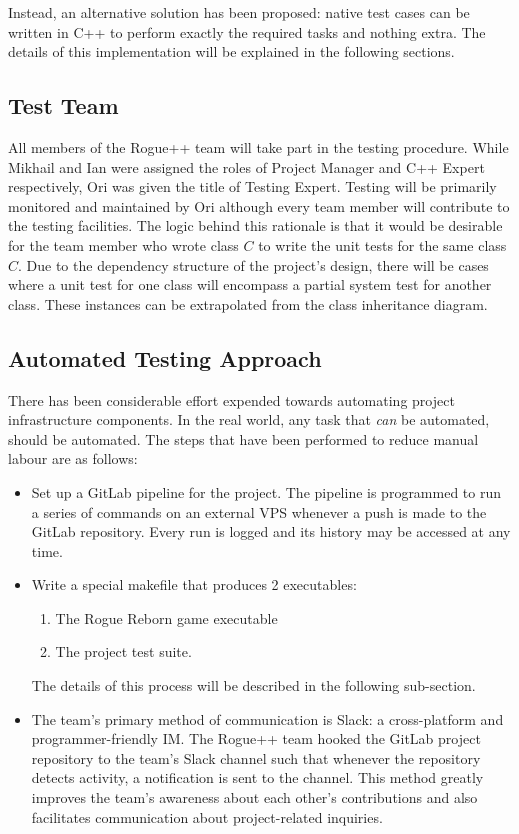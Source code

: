 \documentclass[12pt, titlepage]{article}
\begin{document}
	Instead, an alternative solution has been proposed: native test cases can be written in C++ to perform exactly the required tasks and nothing extra.  The details of this implementation will be explained in the following sections.

	\subsection{Test Team}

	All members of the Rogue++ team will take part in the testing procedure.  While Mikhail and Ian were assigned the roles of Project Manager and C++ Expert respectively, Ori was given the title of Testing Expert. Testing will be primarily monitored and maintained by Ori although every team member will contribute to the testing facilities.  The logic behind this rationale is that it would be desirable for the team member who wrote class $C$ to write the unit tests for the same class $C$.  Due to the dependency structure of the project's design, there will be cases where a unit test for one class will encompass a partial system test for another class.  These instances can be extrapolated from the class inheritance diagram.

	\subsection{Automated Testing Approach}

	There has been considerable effort expended towards automating project infrastructure components.  In the real world, any task that \textit{can} be automated, should be automated.  The steps that have been performed to reduce manual labour are as follows:

	\begin{itemize}
		\item Set up a GitLab pipeline for the project.  The pipeline is programmed to run a series of commands on an external VPS whenever a push is made to the GitLab repository.  Every run is logged and its history may be accessed at any time.
		\item Write a special makefile that produces 2 executables:
		\begin{enumerate}
			\item The Rogue Reborn game executable
			\item The project test suite.
		\end{enumerate}
		The details of this process will be described in the following sub-section.
		\item The team's primary method of communication is Slack: a cross-platform and programmer-friendly IM.  The Rogue++ team hooked the GitLab project repository to the team's Slack channel such that whenever the repository detects activity, a notification is sent to the channel.  This method greatly improves the team's awareness about each other's contributions and also facilitates communication about project-related inquiries.
	\end{itemize}
\end{document}

